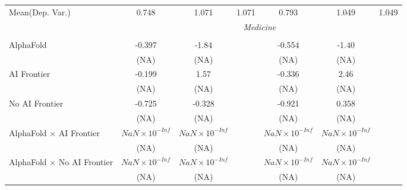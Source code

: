 \begin{tabular}{lcccccc}
Mean(Dep. Var.) & 0.748 & 1.071 & 1.071 & 0.793 & 1.049 & 1.049 \\
 & \multicolumn{6}{c}{\textit{Medicine}} \\ \\
   AlphaFold                                                                  & -0.397                 & -1.84                  &                        & -0.554                 & -1.40                  &   \\   
                                                                              & (NA)                   & (NA)                   &                        & (NA)                   & (NA)                   &   \\   
   AI Frontier                                                                & -0.199                 & 1.57                   &                        & -0.336                 & 2.46                   &   \\   
                                                                              & (NA)                   & (NA)                   &                        & (NA)                   & (NA)                   &   \\   
   No AI Frontier                                                             & -0.725                 & -0.328                 &                        & -0.921                 & 0.358                  &   \\   
                                                                              & (NA)                   & (NA)                   &                        & (NA)                   & (NA)                   &   \\   
   AlphaFold $\times$ AI Frontier                                             & $NaN\times 10^{-Inf}$  & $NaN\times 10^{-Inf}$  &                        & $NaN\times 10^{-Inf}$  & $NaN\times 10^{-Inf}$  &   \\   
                                                                              & (NA)                   & (NA)                   &                        & (NA)                   & (NA)                   &   \\   
   AlphaFold $\times$ No AI Frontier                                          & $NaN\times 10^{-Inf}$  & $NaN\times 10^{-Inf}$  &                        & $NaN\times 10^{-Inf}$  & $NaN\times 10^{-Inf}$  &   \\   
                                                                              & (NA)                   & (NA)                   &                        & (NA)                   & (NA)                   &   \\   

\end{tabular}
